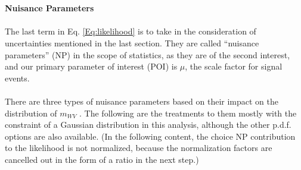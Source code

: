 \\
\\{\bf Nuisance Parameters}
\\
\\The last term in Eq. \ref{Eq:likelihood} is to take in the consideration of uncertainties mentioned in the last section. They are called ``nuisance parameters'' (NP) in the scope of statistics, as they are of the second interest, and our primary parameter of interest (POI) is $\mu$, the scale factor for signal events.
\\
\\There are three types of nuisance parameters based on their impact on the distribution of $m_{WV}$ \cite{NuiTreats}. The following are the treatments to them mostly with the constraint of a Gaussian distribution in this analysis, although the other p.d.f. options are also available. (In the following content, the choice NP contribution to the likelihood is not normalized, because the normalization factors are cancelled out in the form of a ratio in the next step.)
